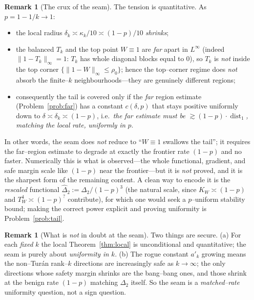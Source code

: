 \documentclass[11pt]{article}
\theoremstyle{definition}
\newtheorem{remark}[theorem]{Remark}
\newcommand{\dist}{\operatorname{dist}}
\newcommand{\tw}{T_W}
\newcommand{\kw}{K_W}
\newcommand{\Tk}{T_k}
\newcommand{\Linf}[1]{\lVert #1\rVert_\infty}
\begin{document}
\begin{remark}[The crux of the seam]\label{rem:seam}
The tension is quantitative.  As $p=1-1/k\to1$:
\begin{itemize}[leftmargin=1.4em]
\item the local radius $\delta_k\asymp\kappa_k/10\asymp(1-p)/10$ \emph{shrinks};
\item the balanced $\Tk$ and the top point $W\equiv1$ are \emph{far} apart in
$L^\infty$ (indeed $\Linf{1-\Tk}=1$: $\Tk$ has whole diagonal blocks equal to $0$),
so $\Tk$ is \emph{not} inside the top corner $\{\Linf{1-W}\le\rho_0\}$; hence the
top--corner regime does \emph{not} absorb the finite--$k$ neighbourhoods---they are
genuinely different regions;
\item consequently the tail is covered only if the \emph{far} region estimate
(Problem~\ref{prob:far}) has a constant $c(\delta,p)$ that stays positive uniformly
down to $\delta\asymp\delta_k\asymp(1-p)$, i.e.\ \emph{the far estimate must be
$\gtrsim(1-p)\cdot\dist_1$, matching the local rate, uniformly in $p$}.
\end{itemize}
In other words, the seam does \emph{not} reduce to ``$W\equiv1$ swallows the tail'';
it requires the far--region estimate to degrade at exactly the frontier rate
$(1-p)$ and no faster.  Numerically this is what is observed---the whole functional,
gradient, and safe margin scale like $(1-p)$ near the frontier---but it is
\emph{not} proved, and it is the sharpest form of the remaining content.  A clean
way to encode it is the \emph{rescaled} functional $\widehat\Delta_2:=\Delta_2/(1-p)^3$
(the natural scale, since $\kw\asymp(1-p)$ and $\tw^4\asymp(1-p)^{?}$ contribute),
for which one would seek a $p$--uniform stability bound; making the correct power
explicit and proving uniformity is Problem~\ref{prob:tail}.
\end{remark}

\begin{remark}[What is \emph{not} in doubt at the seam]
Two things are secure.  (a) For each \emph{fixed} $k$ the local
Theorem~\ref{thm:local} is unconditional and quantitative; the seam is purely about
\emph{uniformity in $k$}.  (b) The rogue constant $a'_k$ growing means the
non--Turán rank--$k$ directions are increasingly safe as $k\to\infty$; the only
directions whose safety margin shrinks are the bang--bang ones, and those shrink at
the benign rate $(1-p)$ matching $\Delta_2$ itself.  So the seam is a
\emph{matched--rate} uniformity question, not a sign question.
\end{remark}
\end{document}
